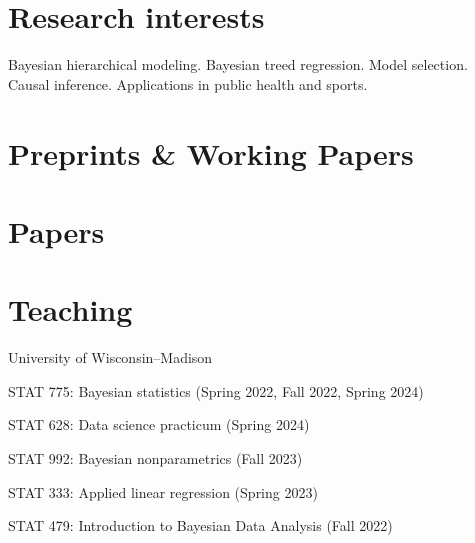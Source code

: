 \documentclass[10pt]{article}
\renewenvironment{itemize}{
  \begin{list}{}{
    \setlength{\leftmargin}{1.5em}
  }
}{
  \end{list}
}
\begin{document}
\section*{Research interests}
\begin{itemize}
\item{Bayesian hierarchical modeling. Bayesian treed regression. Model selection. Causal inference. Applications in public health and sports.}
\end{itemize}

\section*{Preprints \& Working Papers}
\begin{refsection}[preprint]
\nocite{*}
\printbibliography[heading=none]
\end{refsection}

\section*{Papers}
\begin{refsection}[pubs]
\nocite{*}
\printbibliography[heading=none]
\end{refsection}

\section*{Teaching}

\begin{itemize}
\item{University of Wisconsin--Madison}
\begin{itemize}
\item{STAT 775: Bayesian statistics (Spring 2022, Fall 2022, Spring 2024)}
\item{STAT 628: Data science practicum (Spring 2024)}
\item{STAT 992: Bayesian nonparametrics (Fall 2023)}
\item{STAT 333: Applied linear regression (Spring 2023)}
\item{STAT 479: Introduction to Bayesian Data Analysis (Fall 2022)}
\end{itemize}
\end{itemize}
\end{document}
